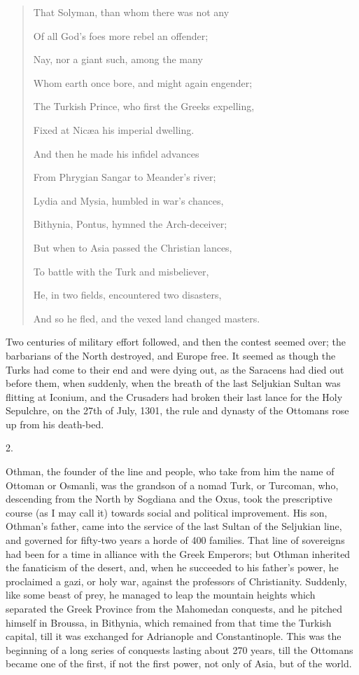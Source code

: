 \begin{quote}

That Solyman,
than whom there was not any

Of all God's foes more rebel an offender;

Nay, nor a giant such, among the many

Whom earth once bore, and might again engender;

The Turkish Prince, who first the Greeks expelling,

Fixed at Nicæa his imperial dwelling.

And then he
made his infidel advances

From Phrygian Sangar to Meander's river;

Lydia and Mysia, humbled in war's chances,

Bithynia, Pontus, hymned the Arch-deceiver;

But when to Asia passed the Christian lances,

To battle with the Turk and misbeliever,

He, in two fields, encountered two disasters,

And so he fled, and the vexed land changed masters.

\end{quote}

Two centuries of military
effort followed, and then the contest seemed over; the
barbarians of the North destroyed, and Europe free. It seemed as
though the Turks had come to their end and were dying out, as the
Saracens had died out before them, when suddenly, when the breath of
the last Seljukian Sultan was flitting at Iconium, and the Crusaders
had broken their last lance for the Holy Sepulchre, on the 27th of
July, 1301, the rule and dynasty of the Ottomans rose up from his
death-bed.

2.

Othman, the founder of the
line and people, who take from him the name of Ottoman or Osmanli, was
the grandson of a nomad Turk, or Turcoman, who, descending from the
North by Sogdiana and the Oxus, took the prescriptive course (as I may
call it) towards social and political improvement. His son, Othman's
father, came into the service of the last Sultan of the Seljukian
line, and governed for fifty-two years a horde of 400 families. That
line of sovereigns had been for a time in alliance with the Greek
Emperors; but Othman inherited the fanaticism of the desert, and, when
he succeeded to his father's power, he proclaimed a gazi, or holy war,
against the professors of Christianity. Suddenly, like some beast of
prey, he managed to leap the mountain heights which separated the
Greek Province from the Mahomedan conquests, and he pitched himself in
Broussa, in Bithynia, which remained from that time the Turkish
capital, till it was exchanged for Adrianople and Constantinople. This
was the beginning of a long series of conquests lasting about 270
years, till the Ottomans became one of the first, if not the first
power, not only of Asia, but of the world.

